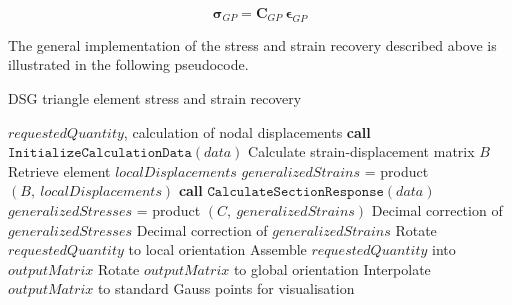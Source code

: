 \begin{equation} 
\boldsymbol{\sigma}_{GP} = \mathbf{C}_{GP}\ \boldsymbol{\epsilon}_{GP}
\label{eqt21}
\end{equation}

The general implementation of the stress and strain recovery described above is illustrated in the following pseudocode.

\begin{algorithm}
	\caption{DSG triangle element stress and strain recovery}
	\label{DSG triangle element stress and strain recovery}
	\begin{algorithmic}[1]
		\Require $requestedQuantity$, calculation of nodal displacements
		\State \textbf{call} $\texttt{InitializeCalculationData}(data)$
		\State \hspace{\algorithmicindent}Calculate strain-displacement matrix $B$
		\State \hspace{\algorithmicindent}Retrieve element $localDisplacements$
		\State $generalizedStrains$ = product$(B,\ localDisplacements)$
				\State \textbf{call} $\texttt{CalculateSectionResponse}(data)$
				\State $generalizedStresses$ = product $(C,\ generalizedStrains)$
				\State Decimal correction of $generalizedStresses$
		\EndIf
		\State Decimal correction of $generalizedStrains$ 
				\State Rotate $requestedQuantity$ to local orientation
		\EndIf
		\State Assemble $requestedQuantity$ into $outputMatrix$
				\State Rotate $outputMatrix$ to global orientation
		\EndIf
		\State Interpolate $outputMatrix$ to standard Gauss points for visualisation
	\end{algorithmic}
\end{algorithm}